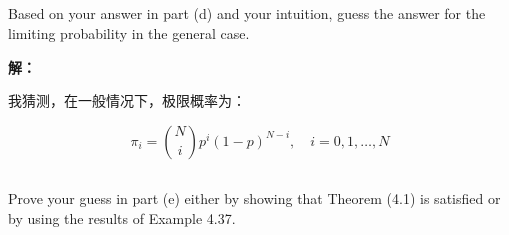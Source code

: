 \documentclass[12pt,a4paper]{article}
\begin{document}
\subsection{}

Based on your answer in part (d) and your intuition, guess the answer for the limiting probability in the general case.

\begin{answerbox}
\textbf{解：}

我猜测，在一般情况下，极限概率为：

$$
\pi_i = \binom{N}{i} p^i (1-p)^{N-i}, \quad i = 0, 1, \ldots, N
$$

\end{answerbox}

\subsection{}

Prove your guess in part (e) either by showing that Theorem (4.1) is satisfied or by using the results of Example 4.37.
\end{document}
